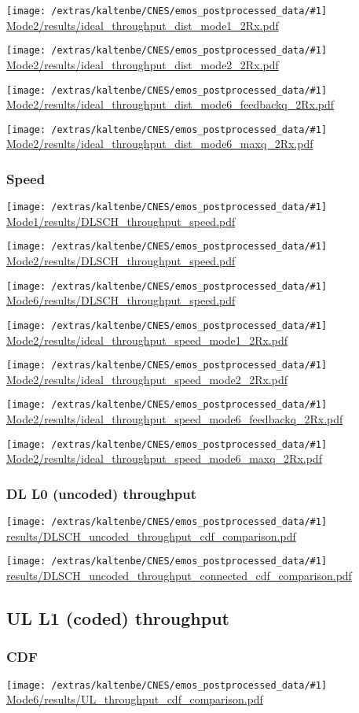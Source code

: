 \documentclass[a4paper,10pt]{article}
\newcommand{\printfile}[1]{
 \begin{minipage}{8cm}
  \centering
  \texttt{[image: /extras/kaltenbe/CNES/emos\_postprocessed\_data/\#1]}
  \url{#1}

 \end{minipage}
}
\begin{document}
\printfile{Mode2/results/ideal_throughput_dist_mode1_2Rx.pdf}
%
\printfile{Mode2/results/ideal_throughput_dist_mode2_2Rx.pdf}

\printfile{Mode2/results/ideal_throughput_dist_mode6_feedbackq_2Rx.pdf}
%
\printfile{Mode2/results/ideal_throughput_dist_mode6_maxq_2Rx.pdf}

\subsubsection{Speed}

\printfile{Mode1/results/DLSCH_throughput_speed.pdf}
\printfile{Mode2/results/DLSCH_throughput_speed.pdf}

\printfile{Mode6/results/DLSCH_throughput_speed.pdf}


\printfile{Mode2/results/ideal_throughput_speed_mode1_2Rx.pdf}
%
\printfile{Mode2/results/ideal_throughput_speed_mode2_2Rx.pdf}

\printfile{Mode2/results/ideal_throughput_speed_mode6_feedbackq_2Rx.pdf}
%
\printfile{Mode2/results/ideal_throughput_speed_mode6_maxq_2Rx.pdf}



\subsubsection{DL L0 (uncoded) throughput}

\printfile{results/DLSCH_uncoded_throughput_cdf_comparison.pdf}
\printfile{results/DLSCH_uncoded_throughput_connected_cdf_comparison.pdf}

\subsection{UL L1 (coded) throughput}

\subsubsection{CDF}
\printfile{Mode6/results/UL_throughput_cdf_comparison.pdf}
\end{document}
